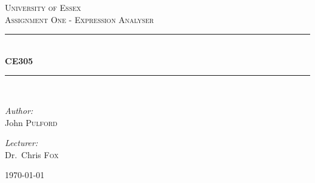 \documentclass[a4paper,12pt]{article}
\begin{document}
\begin{titlepage}
    \newcommand{\HRule}{\rule{\linewidth}{0.5mm}}
    \begin{center}


        \textsc{\LARGE University of Essex}\\[1.5cm]

        \textsc{\Large Assignment One - Expression Analyser}\\[0.5cm]

        \HRule \\[0.4cm]
        { \huge \bfseries \gls{CE305} \\[0.4cm] }

        \HRule \\[1.5cm]

        \begin{minipage}{0.4\textwidth}
            \begin{flushleft} \large
                \emph{Author:}\\
                John \textsc{Pulford}
            \end{flushleft}
        \end{minipage}
        \begin{minipage}{0.4\textwidth}
            \begin{flushright} \large
                \emph{Lecturer:} \\
                Dr.~Chris \textsc{Fox}
            \end{flushright}
        \end{minipage}

        \vfill

        {\large \today}

    \end{center}
\end{titlepage}
\end{document}

